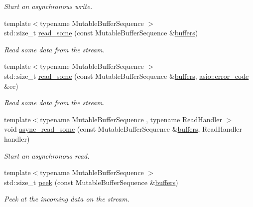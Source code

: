 \begin{DoxyCompactItemize}
\begin{DoxyCompactList}\small\item\em Start an asynchronous write. \end{DoxyCompactList}\item 
{\footnotesize template$<$typename Mutable\+Buffer\+Sequence $>$ }\\std\+::size\+\_\+t \hyperlink{classasio_1_1ssl_1_1old_1_1stream_a0af187c4f0f580a4941538d9c9c43ef5}{read\+\_\+some} (const Mutable\+Buffer\+Sequence \&\hyperlink{group__async__read_ga54dede45c3175148a77fe6635222c47d}{buffers})
\begin{DoxyCompactList}\small\item\em Read some data from the stream. \end{DoxyCompactList}\item 
{\footnotesize template$<$typename Mutable\+Buffer\+Sequence $>$ }\\std\+::size\+\_\+t \hyperlink{classasio_1_1ssl_1_1old_1_1stream_a8cbd732b0ea3986dd05e76aa493e5b65}{read\+\_\+some} (const Mutable\+Buffer\+Sequence \&\hyperlink{group__async__read_ga54dede45c3175148a77fe6635222c47d}{buffers}, \hyperlink{classasio_1_1error__code}{asio\+::error\+\_\+code} \&ec)
\begin{DoxyCompactList}\small\item\em Read some data from the stream. \end{DoxyCompactList}\item 
{\footnotesize template$<$typename Mutable\+Buffer\+Sequence , typename Read\+Handler $>$ }\\void \hyperlink{classasio_1_1ssl_1_1old_1_1stream_a1826635812b110e43aab623bc4c884b7}{async\+\_\+read\+\_\+some} (const Mutable\+Buffer\+Sequence \&\hyperlink{group__async__read_ga54dede45c3175148a77fe6635222c47d}{buffers}, Read\+Handler handler)
\begin{DoxyCompactList}\small\item\em Start an asynchronous read. \end{DoxyCompactList}\item 
{\footnotesize template$<$typename Mutable\+Buffer\+Sequence $>$ }\\std\+::size\+\_\+t \hyperlink{classasio_1_1ssl_1_1old_1_1stream_a5a04711b312236f6e3d07c2b9717fefc}{peek} (const Mutable\+Buffer\+Sequence \&\hyperlink{group__async__read_ga54dede45c3175148a77fe6635222c47d}{buffers})
\begin{DoxyCompactList}\small\item\em Peek at the incoming data on the stream. \end{DoxyCompactList}\item 

\end{DoxyCompactItemize}
